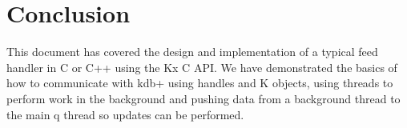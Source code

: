 \chapter{Conclusion}

This document has covered the design and implementation of a typical feed handler in C or C++ using the
Kx C API. We have demonstrated the basics of how to communicate with kdb+ using handles and K objects,
using threads to perform work in the background and pushing data from a background thread to the main
q thread so updates can be performed.